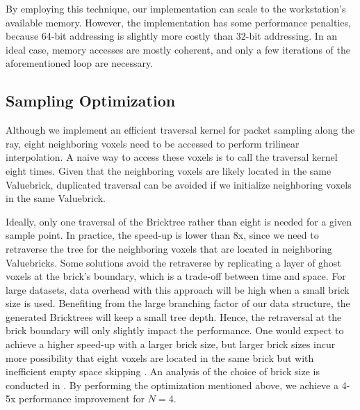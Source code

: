 By employing this technique, our implementation can scale to the workstation's available
memory. However, the implementation has some performance penalties, because 64-bit addressing is slightly more costly than 32-bit addressing. In an ideal case, memory accesses are mostly coherent, and only a few iterations of the aforementioned loop are necessary.


\subsection{Sampling Optimization}
Although we implement an efficient traversal kernel for packet sampling along the ray,
eight neighboring voxels need to be accessed to perform trilinear interpolation.
A naive way to access these voxels is to call the traversal kernel eight
times. Given that the neighboring voxels are likely located in the same Valuebrick,
duplicated traversal can be avoided if we initialize neighboring voxels in the same
Valuebrick. 

Ideally, only one traversal of the Bricktree rather than eight is needed for a given 
sample point. In practice, the speed-up is lower than 8x, since we need to
retraverse the tree for the neighboring voxels that are located in neighboring
Valuebricks. Some solutions avoid the retraverse by replicating a layer of ghost voxels
at the brick's boundary, which is a trade-off between time and space. For large datasets, 
data overhead with this approach will be high when a small brick size is used. Benefiting 
from the large branching factor of our data structure, the generated Bricktrees will keep
a small tree depth. Hence, the retraversal at the brick boundary will only slightly impact the performance. 
One would expect to achieve a higher speed-up with a larger brick size, but larger
brick sizes incur more possibility that eight voxels are located in the same brick
but with inefficient empty space skipping
\cite{fogal2013analysis}. An analysis of the choice of brick size is conducted in
. 
By performing the optimization mentioned above, we achieve a 4-5x
performance improvement for $N=4$. 


